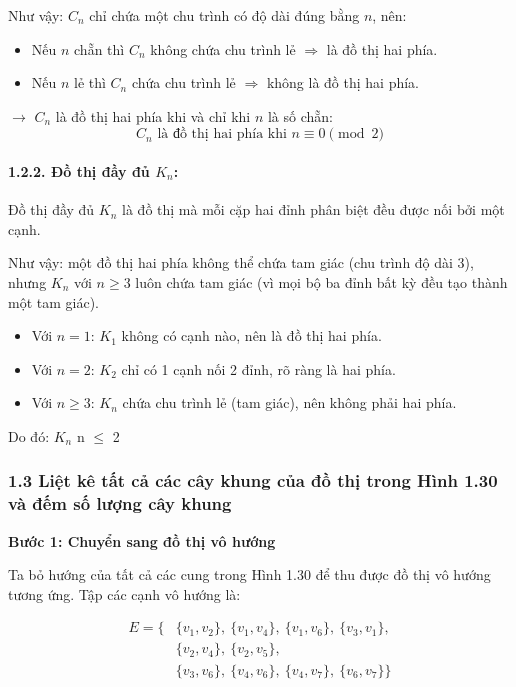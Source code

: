 \documentclass{article}
\begin{document}
	Như vậy: \( C_n \) chỉ chứa một chu trình có độ dài đúng bằng \( n \), nên:
	\begin{itemize}
		\item Nếu \( n \) chẵn thì \( C_n \) không chứa chu trình lẻ \( \Rightarrow \) là đồ thị hai phía.
		\item Nếu \( n \) lẻ thì \( C_n \) chứa chu trình lẻ \( \Rightarrow \) không là đồ thị hai phía.
	\end{itemize}
	
	$\rightarrow$ \( C_n \) là đồ thị hai phía khi và chỉ khi \( n \) là số chẵn:
	\[
	\boxed{C_n \text{ là đồ thị hai phía khi } n \equiv 0 \pmod{2}}
	\]
	
	\paragraph*{1.2.2. Đồ thị đầy đủ \( K_n \):}
	
	Đồ thị đầy đủ \( K_n \) là đồ thị mà mỗi cặp hai đỉnh phân biệt đều được nối bởi một cạnh.
	
	Như vậy: một đồ thị hai phía không thể chứa tam giác (chu trình độ dài 3), nhưng \( K_n \) với \( n \geq 3 \) luôn chứa tam giác (vì mọi bộ ba đỉnh bất kỳ đều tạo thành một tam giác).
	
	\begin{itemize}
		\item Với \( n = 1 \): \( K_1 \) không có cạnh nào, nên là đồ thị hai phía.
		\item Với \( n = 2 \): \( K_2 \) chỉ có 1 cạnh nối 2 đỉnh, rõ ràng là hai phía.
		\item Với \( n \geq 3 \): \( K_n \) chứa chu trình lẻ (tam giác), nên không phải hai phía.
	\end{itemize}
	
	Do đó: $K_n$  n $\leq$ 2
	
	\subsubsection*{1.3 Liệt kê tất cả các cây khung của đồ thị trong Hình 1.30 và đếm số lượng cây khung}
	
	\textbf{Bước 1: Chuyển sang đồ thị vô hướng}
	
	Ta bỏ hướng của tất cả các cung trong Hình 1.30 để thu được đồ thị vô hướng tương ứng. Tập các cạnh vô hướng là:
	
	\[
	\begin{aligned}
		E = \{ 
		& \{v_1, v_2\},\ \{v_1, v_4\},\ \{v_1, v_6\}, \ \{v_3, v_1\}, \\
		& \{v_2, v_4\},\ \{v_2, v_5\}, \\
		& \{v_3, v_6\}, \ \{v_4, v_6\},\ \{v_4, v_7\},\ \{v_6, v_7\} 
		\}
	\end{aligned}
	\]
	
\end{document}
